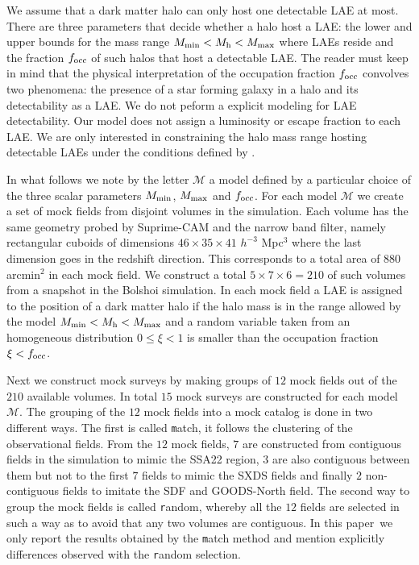 \documentclass[usenatbib]{mn2e}
\newcommand{\documentname}{paper~}
\begin{document}
We assume that a dark matter halo can only host one
detectable LAE at most.  There are three parameters that
decide whether a halo host a LAE: the lower and upper bounds for the
mass range $M_{\rm min}< M_{\rm h} < M_{\rm max}$ where LAEs reside and the fraction $f_{\rm occ}$ of such halos that host a detectable LAE. The reader
must keep in mind that the physical interpretation of the occupation
fraction $f_{\rm occ}$ convolves two phenomena: the presence of a star
forming galaxy in a halo and its detectability as a LAE.  We do not
peform a explicit modeling for LAE detectability. Our model does not
assign a luminosity or escape fraction to each LAE.  We are only
interested in constraining the halo mass range hosting detectable LAEs
under the conditions defined by \cite{Yamada2012}.  


In what follows we note by the letter ${\mathcal M}$ a model
defined by a particular choice of the three scalar parameters $M_{\rm
  min}$, $M_{\rm  max}$ and $f_{\rm occ}$. For each model ${\mathcal
  M}$ we create a set of mock fields from disjoint volumes in the
simulation. Each volume has the same geometry probed by Suprime-CAM
and the narrow band filter, namely rectangular cuboids of dimensions
$46\times 35\times 41$ $h^{-3}$ Mpc$^{3}$ where the last dimension goes
in the redshift direction. This corresponds to a total area of $880$
arcmin$^{2}$ in each mock field. We construct a total $5\times 7
\times 6=210$ of such volumes from a snapshot in the Bolshoi
simulation. In each mock field a LAE is assigned to the position of a
dark matter halo if the halo mass is in the range allowed by the model
$M_{\rm min}<M_{\rm h}<M_{\rm max}$ and a random variable taken from
an homogeneous distribution $0\leq \xi<1$ is smaller than the occupation
fraction $\xi<f_{\rm occ}$.

Next we construct mock surveys by making groups of $12$ mock fields
out of the $210$ available volumes. In total $15$ mock surveys are
constructed for each model $\mathcal{M}$. The grouping of the $12$
mock fields into a mock catalog is done in two different ways. The
first is called {\texttt match}, it follows the clustering of the
observational fields. From the $12$ mock fields, $7$ are constructed
from contiguous fields in the simulation to mimic the SSA22 region,
$3$ are also contiguous between them but not to the first $7$ fields
to mimic the SXDS fields and finally $2$ non-contiguous fields to
imitate the SDF and GOODS-North field.  The second way to group the
mock fields is called {\texttt   random}, whereby all the $12$ fields
are selected in such a way as to avoid that any two volumes are
contiguous. In this \documentname we only report the results obtained
by the {\texttt match} method and mention explicitly differences
observed with the {\texttt random} selection. 
\end{document}
